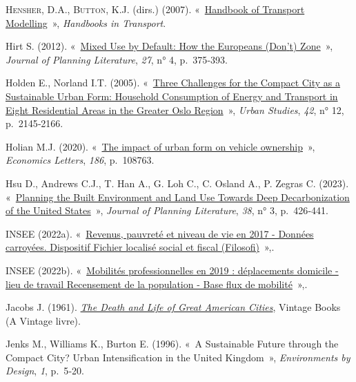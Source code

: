 \documentclass[
  9pt,
  a4paper,
  DIV=11]{scrreprt}
\newlength{\cslhangindent}
\newenvironment{CSLReferences}[2] %
 {\begin{list}{}{%
  \setlength{\itemindent}{0pt}
  \setlength{\leftmargin}{0pt}
  \setlength{\parsep}{0pt}
  \ifodd #1
   \setlength{\leftmargin}{\cslhangindent}
   \setlength{\itemindent}{-1\cslhangindent}
  \fi
  \setlength{\itemsep}{#2\baselineskip}}}
 {\end{list}}
\begin{document}
\begin{CSLReferences}{0}{1}
\textsc{Hensher, D.A.}, \textsc{Button, K.J.} (dirs.) (2007).
{«~\href{https://doi.org/10.1108/9780857245670}{Handbook of Transport
Modelling}~»}, \emph{Handbooks in Transport}.

Hirt S. (2012). {«~\href{https://doi.org/10.1177/0885412212451029}{Mixed
Use by Default: How the Europeans (Don{'}t) Zone}~»}, \emph{Journal of
Planning Literature}, \emph{27}, n° 4, p.~375‑393.

Holden E., Norland I.T. (2005).
{«~\href{https://doi.org/10.1080/00420980500332064}{Three Challenges for
the Compact City as a Sustainable Urban Form: Household Consumption of
Energy and Transport in Eight Residential Areas in the Greater Oslo
Region}~»}, \emph{Urban Studies}, \emph{42}, n° 12, p.~2145‑2166.

Holian M.J. (2020).
{«~\href{https://doi.org/10.1016/j.econlet.2019.108763}{The impact of
urban form on vehicle ownership}~»}, \emph{Economics Letters},
\emph{186}, p.~108763.

Hsu D., Andrews C.J., T. Han A., G. Loh C., C. Osland A., P. Zegras C.
(2023). {«~\href{https://doi.org/10.1177/08854122221097977}{Planning the
Built Environment and Land Use Towards Deep Decarbonization of the
United States}~»}, \emph{Journal of Planning Literature}, \emph{38}, n°
3, p.~426‑441.

INSEE (2022a).
{«~\href{https://www.insee.fr/fr/statistiques/6214811?sommaire=6215217}{Revenus,
pauvreté et niveau de vie en 2017 - Données carroyées. Dispositif
Fichier localisé social et fiscal (Filosofi)}~»},.

INSEE (2022b).
{«~\href{https://www.insee.fr/fr/statistiques/6454112}{Mobilités
professionnelles en 2019 : déplacements domicile - lieu de travail
Recensement de la population - Base flux de mobilité}~»},.

Jacobs J. (1961).
\emph{\href{https://books.google.fr/books?id=5FdHAAAAMAAJ}{The Death and
Life of Great American Cities}}, Vintage Books (A Vintage livre).

Jenks M., Williams K., Burton E. (1996). {«~A Sustainable Future through
the Compact City? Urban Intensification in the United Kingdom~»},
\emph{Environments by Design}, \emph{1}, p.~5‑20.


\end{CSLReferences}
\end{document}

